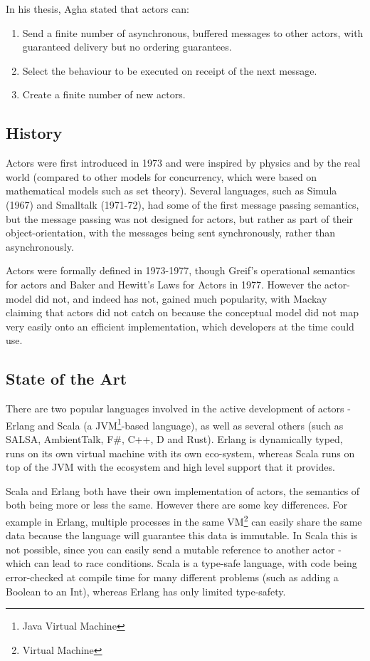 \documentclass[pdftex,11pt,a4paper]{report}
\begin{document}
In his thesis, Agha\cite{agha1985} stated that actors can:
\begin{enumerate}[noitemsep]
\item Send a finite number of asynchronous, buffered messages to other actors, with guaranteed delivery but no ordering guarantees.
\item Select the behaviour to be executed on receipt of the next message.
\item Create a finite number of new actors.
\end{enumerate}

\subsection{History}

Actors were first introduced in 1973\cite{hewitt1973} and were inspired by physics and by the real world\cite{hewitt2006} (compared to other models for concurrency, which were based on mathematical models such as set theory\cite{Milner:1993:EIT:151233.151240}).
Several languages, such as Simula (1967) and Smalltalk (1971-72), had some of the first message passing semantics, but the message passing was not designed for actors, but rather as part of their object-orientation, with the messages being sent synchronously, rather than asynchronously.

Actors were formally defined in 1973-1977, though Greif's operational semantics for actors\cite{grief1975} and Baker and Hewitt's Laws for Actors in 1977\cite{hewitt1977}.
However the actor-model did not, and indeed has not, gained much popularity, with Mackay\cite{mackay97} claiming that actors did not catch on because the conceptual model did not map very easily onto an efficient implementation, which developers at the time could use.

\subsection{State of the Art}

There are two popular languages involved in the active development of actors - Erlang and Scala (a JVM\footnote{Java Virtual Machine}-based language), as well as several others (such as SALSA, AmbientTalk, F\#, C++, D and Rust).
Erlang is dynamically typed, runs on its own virtual machine with its own eco-system, whereas Scala runs on top of the JVM with the ecosystem and high level support that it provides.

Scala and Erlang both have their own implementation of actors, the semantics of both being more or less the same.
However there are some key differences.
For example in Erlang, multiple processes in the same VM\footnote{Virtual Machine} can easily share the same data because the language will guarantee this data is immutable.
In Scala this is not possible, since you can easily send a mutable reference to another actor - which can lead to race conditions\cite{akka-mutable}.
Scala is a type-safe language, with code being error-checked at compile time for many different problems (such as adding a Boolean to an Int), whereas Erlang has only limited type-safety.
\end{document}
